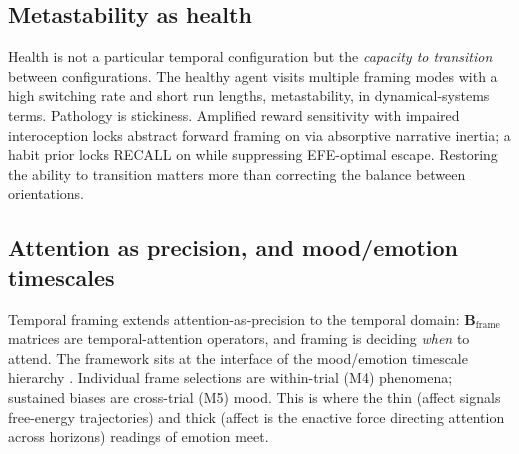 \documentclass[11pt,a4paper]{article}
\begin{document}
\subsection{Metastability as health}
Health is not a particular temporal configuration but the \emph{capacity to transition}
between configurations. The healthy agent visits multiple framing modes with a high
switching rate and short run lengths, metastability, in dynamical-systems terms.
Pathology is stickiness. Amplified reward sensitivity with impaired interoception locks
abstract forward framing on via absorptive narrative inertia; a habit prior locks RECALL
on while suppressing EFE-optimal escape. Restoring the ability to transition matters more than
correcting the balance between orientations.

\subsection{Attention as precision, and mood/emotion timescales}
Temporal framing extends attention-as-precision \citep{feldman2010attention} to the
temporal domain: $\mathbf B_{\text{frame}}$ matrices are temporal-attention operators,
and framing is deciding \emph{when} to attend. The framework sits at the interface of
the mood/emotion timescale hierarchy \citep{hesp2021deeply}. Individual frame
selections are within-trial (M4) phenomena; sustained biases are cross-trial (M5) mood.
This is where the thin (affect signals free-energy trajectories) and thick (affect is
the enactive force directing attention across horizons) readings of emotion meet.
\end{document}
